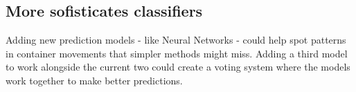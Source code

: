 		\subsection{More sofisticates classifiers}

			Adding new prediction models - like Neural Networks - could help spot patterns in container movements that
			simpler methods might miss. Adding a third model to work alongside the current two could create a voting
			system where the models work together to make better predictions.